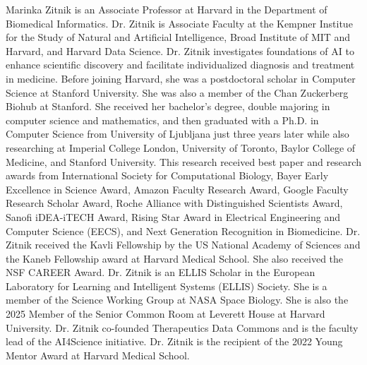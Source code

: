 Marinka Zitnik is an Associate Professor at Harvard in the Department of Biomedical Informatics. Dr. Zitnik is Associate Faculty at the Kempner Institue for the Study of Natural and Artificial Intelligence, Broad Institute of MIT and Harvard, and Harvard Data Science. Dr. Zitnik investigates foundations of AI to enhance scientific discovery and facilitate individualized diagnosis and treatment in medicine. Before joining Harvard, she was a postdoctoral scholar in Computer Science at Stanford University. She was also a member of the Chan Zuckerberg Biohub at Stanford. She received her bachelor’s degree, double majoring in computer science and mathematics, and then graduated with a Ph.D. in Computer Science from University of Ljubljana just three years later while also researching at Imperial College London, University of Toronto, Baylor College of Medicine, and Stanford University. This research received best paper and research awards from International Society for Computational Biology, Bayer Early Excellence in Science Award, Amazon Faculty Research Award, Google Faculty Research Scholar Award, Roche Alliance with Distinguished Scientists Award, Sanofi iDEA-iTECH Award, Rising Star Award in Electrical Engineering and Computer Science (EECS), and Next Generation Recognition in Biomedicine. Dr. Zitnik received the Kavli Fellowship by the US National Academy of Sciences and the Kaneb Fellowship award at Harvard Medical School. She also received the NSF CAREER Award. Dr. Zitnik is an ELLIS Scholar in the European Laboratory for Learning and Intelligent Systems (ELLIS) Society. She is a member of the Science Working Group at NASA Space Biology. She is also the 2025 Member of the Senior Common Room at Leverett House at Harvard University. Dr. Zitnik co-founded Therapeutics Data Commons and is the faculty lead of the AI4Science initiative. Dr. Zitnik is the recipient of the 2022 Young Mentor Award at Harvard Medical School.